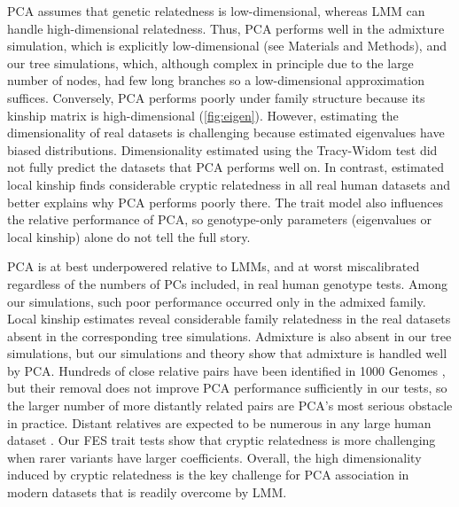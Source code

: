\documentclass[11pt]{article}
\begin{document}
\begin{linenumbers}
PCA assumes that genetic relatedness is low-dimensional, whereas LMM can handle high-dimensional relatedness.
Thus, PCA performs well in the admixture simulation, which is explicitly low-dimensional (see Materials and Methods), and our tree simulations, which, although complex in principle due to the large number of nodes, had few long branches so a low-dimensional approximation suffices.
Conversely, PCA performs poorly under family structure because its kinship matrix is high-dimensional (\cref{fig:eigen}).
However, estimating the dimensionality of real datasets is challenging because estimated eigenvalues have biased distributions.
Dimensionality estimated using the Tracy-Widom test \citep{patterson_population_2006} did not fully predict the datasets that PCA performs well on.
In contrast, estimated local kinship finds considerable cryptic relatedness in all real human datasets and better explains why PCA performs poorly there.
The trait model also influences the relative performance of PCA, so genotype-only parameters (eigenvalues or local kinship) alone do not tell the full story.

PCA is at best underpowered relative to LMMs, and at worst miscalibrated regardless of the numbers of PCs included, in real human genotype tests.
Among our simulations, such poor performance occurred only in the admixed family.
Local kinship estimates reveal considerable family relatedness in the real datasets absent in the corresponding tree simulations.
Admixture is also absent in our tree simulations, but our simulations and theory show that admixture is handled well by PCA.
Hundreds of close relative pairs have been identified in 1000 Genomes \citep{gazal_high_2015, al-khudhair_inference_2015, fedorova_atlas_2016, schlauch_identification_2017}, but their removal does not improve PCA performance sufficiently in our tests, so the larger number of more distantly related pairs are PCA's most serious obstacle in practice.
Distant relatives are expected to be numerous in any large human dataset \citep{henn_cryptic_2012, shchur_number_2018, loh_mixed-model_2018}.
Our FES trait tests show that cryptic relatedness is more challenging when rarer variants have larger coefficients.
Overall, the high dimensionality induced by cryptic relatedness is the key challenge for PCA association in modern datasets that is readily overcome by LMM.


\end{linenumbers}
\end{document}
